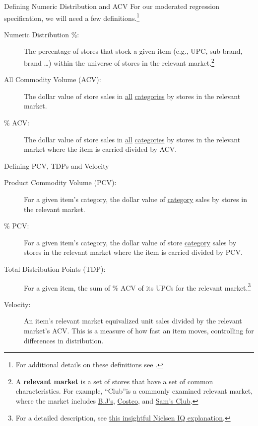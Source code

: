 \documentclass[pdf]{beamer}
\newcommand{\empr}[1]{{\color{franklinblue}\textbf{#1}}}
\theoremstyle{remark}
\theoremstyle{definition}
\begin{document}
\begin{frame}[t]{Defining Numeric Distribution and ACV}
For our moderated regression specification, we will need a few definitions.\footnote{For additional details on these definitions see \cite{bendle2020}.} \\
\vspace{-0.0ex}
\small
\begin{description}
  \item[Numeric Distribution \%:] The percentage of stores that stock a given item (e.g., UPC, sub-brand, brand \ldots) within the universe of stores in the relevant market.\footnote{A \empr{relevant market} is a set of stores that have a set of common characteristics.  For example, ``Club''is a commonly examined relevant market, where the market includes \href{https://www.bjs.com/}{B.J's}, \href{https://www.costco.com/}{Costco}, and \href{https://www.samsclub.com/}{Sam's Club}.} 
  \item[All Commodity Volume (ACV):] The dollar value of store sales in \underline{all} \underline{categories} by stores in the relevant market. 
  \item [\% ACV:]  The dollar value of store sales in \underline{all} \underline{categories} by stores in the relevant market where the item is carried divided by ACV.
\end{description}
\end{frame}

\begin{frame}[t]{Defining PCV, TDPs and Velocity}
\small
  \begin{description}
  \item[Product Commodity Volume (PCV):] For a given item's category, the dollar value of \underline{category} sales by stores in the relevant market.
  \item[\% PCV:] For a given item's category, the dollar value of store \underline{category} sales by stores in the relevant market where the item is carried divided by PCV.
  \item[Total Distribution Points (TDP):]  For a given item, the sum of \% ACV of its UPCs for the relevant market.\footnote{For a detailed description, see \href{https://nielseniq.com/wp-content/uploads/sites/4/2021/02/ConnectedSystem-Job-Aid-Understanding-TDPs.pdf}{this insightful Nielsen IQ explanation}.} 
  \item[Velocity:]  An item's relevant market equivalized unit sales divided by the relevant market's ACV.   This is a  measure of how fast an item moves, controlling for differences in distribution.   
\end{description}
\end{frame}
\end{document}
